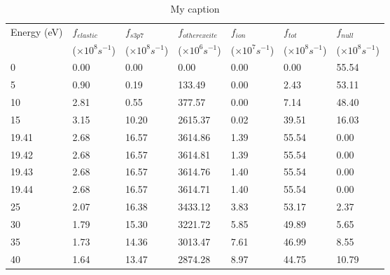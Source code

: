 \documentclass[12pt]{article}
\begin{document}
\begin{table}[]
	\centering
	\caption{My caption}
	\label{my-label}
	\begin{tabular}{lllllll}
		Energy (eV) & $f_{elastic}$         & $f_{s3p7}$            & $f_{other excite}$    & $f_{ion}$             & $f_{tot}$             & $f_{null}$            \\
		& ($\times10^8 s^{-1}$) & ($\times10^8 s^{-1}$) & ($\times10^6 s^{-1}$) & ($\times10^7 s^{-1}$) & ($\times10^8 s^{-1}$) & ($\times10^8 s^{-1}$) \\
		0           & 0.00                  & 0.00                  & 0.00                  & 0.00                  & 0.00                  & 55.54                 \\
		5           & 0.90                  & 0.19                  & 133.49                & 0.00                  & 2.43                  & 53.11                 \\
		10          & 2.81                  & 0.55                  & 377.57                & 0.00                  & 7.14                  & 48.40                 \\
		15          & 3.15                  & 10.20                 & 2615.37               & 0.02                  & 39.51                 & 16.03                 \\
		19.41       & 2.68                  & 16.57                 & 3614.86               & 1.39                  & 55.54                 & 0.00                  \\
		19.42       & 2.68                  & 16.57                 & 3614.81               & 1.39                  & 55.54                 & 0.00                  \\
		19.43       & 2.68                  & 16.57                 & 3614.76               & 1.40                  & 55.54                 & 0.00                  \\
		19.44       & 2.68                  & 16.57                 & 3614.71               & 1.40                  & 55.54                 & 0.00                  \\
		25          & 2.07                  & 16.38                 & 3433.12               & 3.83                  & 53.17                 & 2.37                  \\
		30          & 1.79                  & 15.30                 & 3221.72               & 5.85                  & 49.89                 & 5.65                  \\
		35          & 1.73                  & 14.36                 & 3013.47               & 7.61                  & 46.99                 & 8.55                  \\
		40          & 1.64                  & 13.47                 & 2874.28               & 8.97                  & 44.75                 & 10.79                
	\end{tabular}
\end{table}
\end{document}
